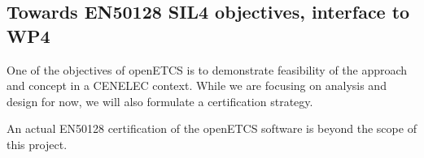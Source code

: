 \subsection{Towards EN50128 SIL4 objectives, interface to WP4}

One of the objectives of openETCS is to demonstrate feasibility of the approach and concept in a CENELEC context.
While we are focusing on analysis and design for now, we will also formulate a certification strategy.

An actual EN50128 certification of the openETCS software is beyond the scope of this project.


%
%



